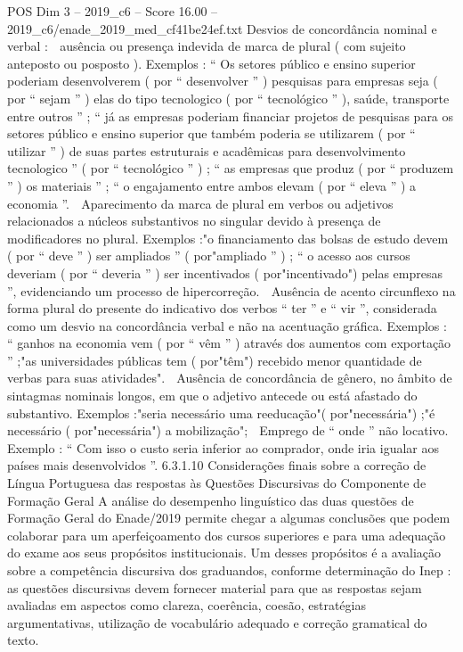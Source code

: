 \begin{textsample}{POS Dim 3 – 2019\_c6 – Score 16.00 – 2019\_c6/enade\_2019\_med\_cf41be24ef.txt}
Desvios de concordância nominal e verbal :  ausência ou presença indevida de marca de plural ( com sujeito anteposto ou posposto ).
Exemplos : “ Os setores público e ensino superior poderiam desenvolverem ( por “ desenvolver ” ) pesquisas para empresas seja ( por “ sejam ” ) elas do tipo tecnologico ( por “ tecnológico ” ), saúde, transporte entre outros ” ; “ já as empresas poderiam financiar projetos de pesquisas para os setores público e ensino superior que também poderia se utilizarem ( por “ utilizar ” ) de suas partes estruturais e acadêmicas para desenvolvimento tecnologico ” ( por “ tecnológico ” ) ; “ as empresas que produz ( por “ produzem ” ) os materiais ” ; “ o engajamento entre ambos elevam ( por “ eleva ” ) a economia ”.  Aparecimento da marca de plural em verbos ou adjetivos relacionados a núcleos substantivos no singular devido à presença de modificadores no plural.
Exemplos :"o financiamento das bolsas de estudo devem ( por “ deve ” ) ser ampliados ” ( por"ampliado ” ) ; “ o acesso aos cursos deveriam ( por “ deveria ” ) ser incentivados ( por"incentivado") pelas empresas ”, evidenciando um processo de hipercorreção.  Ausência de acento circunflexo na forma plural do presente do indicativo dos verbos “ ter ” e “ vir ”, considerada como um desvio na concordância verbal e não na acentuação gráfica.
Exemplos : “ ganhos na economia vem ( por “ vêm ” ) através dos aumentos com exportação ” ;"as universidades públicas tem ( por"têm") recebido menor quantidade de verbas para suas atividades".  Ausência de concordância de gênero, no âmbito de sintagmas nominais longos, em que o adjetivo antecede ou está afastado do substantivo.
Exemplos :"seria necessário uma reeducação"( por"necessária") ;"é necessário ( por"necessária") a mobilização";  Emprego de “ onde ” não locativo.
Exemplo : “ Com isso o custo seria inferior ao comprador, onde iria igualar aos países mais desenvolvidos ”. 6.3.1.10 Considerações finais sobre a correção de Língua Portuguesa das respostas às Questões Discursivas do Componente de Formação Geral A análise do desempenho linguístico das duas questões de Formação Geral do Enade/2019 permite chegar a algumas conclusões que podem colaborar para um aperfeiçoamento dos cursos superiores e para uma adequação do exame aos seus propósitos institucionais.
Um desses propósitos é a avaliação sobre a competência discursiva dos graduandos, conforme determinação do Inep : as questões discursivas devem fornecer material para que as respostas sejam avaliadas em aspectos como clareza, coerência, coesão, estratégias argumentativas, utilização de vocabulário adequado e correção gramatical do texto.

\end{textsample}
